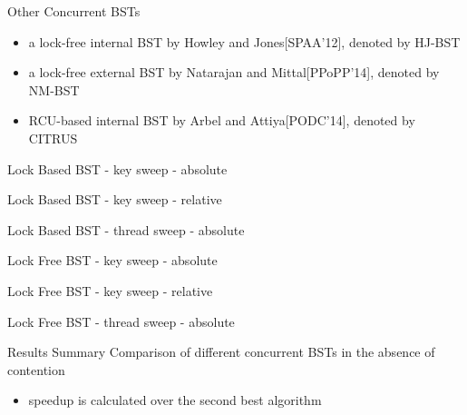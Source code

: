 \begin{frame}{Other Concurrent BSTs}
\begin{itemize}
\item a lock-free internal BST by Howley and Jones[SPAA'12], denoted by HJ-BST
\item a lock-free external BST by Natarajan and Mittal[PPoPP'14], denoted by NM-BST
\item RCU-based internal BST by Arbel and Attiya[PODC'14], denoted by CITRUS 
\end{itemize}
\end{frame}

\begin{frame}{Lock Based BST - key sweep - absolute}
%

\end{frame}

\ifdefined\LONG
\begin{frame}{Lock Based BST - key sweep - relative}

\end{frame}
\fi

\begin{frame}{Lock Based BST - thread sweep - absolute}

\end{frame}

\begin{frame}{Lock Free BST - key sweep - absolute}
%

\end{frame}

\ifdefined\LONG
\begin{frame}{Lock Free BST - key sweep - relative}

\end{frame}
\fi

\begin{frame}{Lock Free BST - thread sweep - absolute}

\end{frame}

\begin{frame}{Results Summary}
Comparison of different concurrent BSTs in the absence of contention
\ifdefined\LONG

\pause
\fi
\begin{itemize}
\item speedup is calculated over the second best algorithm
\end{itemize}

\end{frame}

